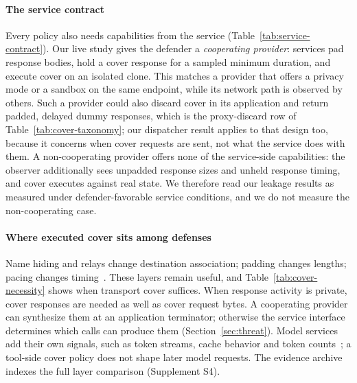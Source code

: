 \paragraph{The service contract}
Every policy also needs capabilities from the service (Table~\ref{tab:service-contract}). Our live study gives the defender a \emph{cooperating provider}: services pad response bodies, hold a cover response for a sampled minimum duration, and execute cover on an isolated clone. This matches a provider that offers a privacy mode or a sandbox on the same endpoint, while its network path is observed by others. Such a provider could also discard cover in its application and return padded, delayed dummy responses, which is the proxy-discard row of Table~\ref{tab:cover-taxonomy}; our dispatcher result applies to that design too, because it concerns when cover requests are sent, not what the service does with them. A non-cooperating provider offers none of the service-side capabilities: the observer additionally sees unpadded response sizes and unheld response timing, and cover executes against real state. We therefore read our leakage results as measured under defender-favorable service conditions, and we do not measure the non-cooperating case.



\paragraph{Where executed cover sits among defenses}
Name hiding and relays change destination association; padding changes lengths; pacing changes timing~\cite{wang2017walkietalkie,gong2020front,juarez2016wtfpad}. These layers remain useful, and Table~\ref{tab:cover-necessity} shows when transport cover suffices. When response activity is private, cover responses are needed as well as cover request bytes. A cooperating provider can synthesize them at an application terminator; otherwise the service interface determines which calls can produce them (Section~\ref{sec:threat}). Model services add their own signals, such as token streams, cache behavior and token counts~\cite{weiss2024prompt,whisperleak2025,earlybird2025,timewilltell2024,carlini2024timing}; a tool-side cover policy does not shape later model requests. The evidence archive indexes the full layer comparison (Supplement S4).
